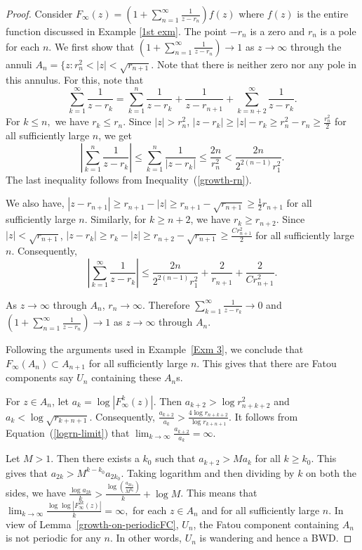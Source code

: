\documentclass[11pt,a4paper]{article}
\begin{document}
\begin{proof}
	 

	Consider $F_\infty (z)=\left(1+\sum_{n=1}^{\infty}\frac{1}{z-r_n}\right) f(z)$ where $f(z)$ is the entire function discussed in Example \ref{1st exm}. The point $-r_n$ is a zero and $r_n$ is a pole for each $n$. We first show that  $\left(1+\sum_{n=1}^{\infty}\frac{1}{z-r_n}\right)\to1$ as $z\to\infty$ through the annuli $A_n=\{z:r_n^2<|z|<\sqrt{r_{n+1}}$. Note that there is neither zero nor any pole in this annulus. For this, note that
	\begin{equation}\label{Eq13}
		\sum_{k=1}^{\infty}\frac{1}{z-r_k}=\sum_{k=1}^{n}\frac{1}{z-r_k}+\frac{1}{z-r_{n+1}}+\sum_{k=n+2}^{\infty}\frac{1}{z-r_k}.
	\end{equation} For  $k \leq n,  $ we have $r_k \le r_n$. Since $|z| > r_n^2$, 
	$|z - r_k| \ge |z| - r_k \ge r_n^2 - r_n \ge \tfrac{r_n^2}{2}$ for all sufficiently large $n$, we get
	$$\left| \sum_{k=1}^{n} \frac{1}{z - r_k} \right|
	\le \sum_{k=1}^{n} \frac{1}{|z - r_k|}
	\le\frac{2n}{r_n^2} < \frac{2n}{2^{2(n-1)}r_1 ^2}.$$ 
	The last inequality follows from Inequality~(\ref{growth-rn}).
	
	We also have, 	$|z - r_{n+1}| \ge r_{n+1} - |z| \ge r_{n+1} - \sqrt{r_{n+1}} \ge \tfrac{1}{2}r_{n+1}
	$ for all sufficiently large $n$. Similarly, for $k \geq n+2$,  we have $r_k \ge r_{n+2}$. Since  $|z| < \sqrt{r_{n+1}}$,
	$|z - r_k| \ge r_k - |z| \ge r_{n+2} - \sqrt{r_{n+1}} \ge \tfrac{C r_{n+1}^2}{2}$ for all sufficiently large $n$. Consequently,
	$$\left|\sum_{k = 1}^{\infty}  \frac{1}{z - r_k} \right|	
	\le \frac{2n}{2^{2(n-1)}r_1 ^2}+ \frac{2}{r_{n+1}} + \frac{2}{Cr_{n+1}^2}.$$
	
	As $z\to\infty$   through   $A_n $, $r_n \to \infty$. Therefore $\sum_{k=1}^{\infty}\frac{1}{z-r_k}\to 0$ and  $\left(1+\sum_{n=1}^{\infty}\frac{1}{z-r_n}\right)\to1$ as $z\to\infty$   through $A_n $.
	\par 
	Following the arguments used in Example~\ref{Exm 3}, we conclude that $F_\infty(A_n) \subset A_{n+1}$ for all sufficiently large $n$. This gives that there are Fatou components say $U_n$  containing these $A_n$s.
	
	\par For $z \in A_n$, let $a_k = \log |F_{\infty}^{k}(z)|$. Then $a_{k+2}>\log  r_{n+k+2}^2 $ and $a_k < \log  \sqrt{r_{k+n+1}}$. Consequently, $ \frac{a_{k+2}}{a_k}> \frac{4 \log r_{n+k+2} }{\log r_{k+n+1}}.$
	It follows from Equation~(\ref{logrn-limit}) that $\lim_{k \to \infty}\frac{a_{k+2}}{a_k}=\infty$.
	
	
	Let $M>1$. Then there exists a $k_0$ such that $a_{k+2}> Ma_{k}$ for all $k \geq k_0$. This gives that $a_{2k}> M^{k-k_0}a_{2k_0}$. Taking logarithm and then dividing by $k$ on both the sides, we have
	$\frac{\log a_{2k}}{k} >\frac{\log (\frac{a_{2k_0}}{M^{k_0}})}{k}+ \log M$. This means that  $\lim_{k \to \infty} \frac{\log \log {|F_{\infty}^{2k}(z)|}}{k} =\infty,$  for each $z \in A_n$ and for all sufficiently large $n$. In view of Lemma~\ref{growth-on-periodicFC}, $U_n$, the Fatou component containing $A_n$ is not periodic for any $n$. In other words, $U_n$ is wandering and hence a BWD.
\end{proof}
\end{document}
